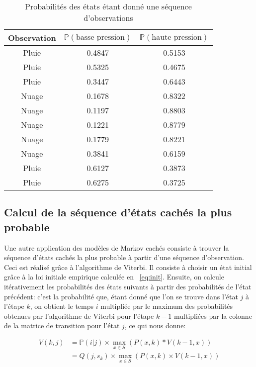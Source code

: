 \documentclass{article}
\begin{document}
\begin{multicols}{2}
\begin{table}[H]
    \begin{center}
        \centering
        \captionsetup{justification=centering}
        \caption{\label{tab:fwdbwd}Probabilités des états étant donné une séquence d'observations}
        \begin{tabular}{|c|c|c|}
            \hline
            Observation & $\mathbb{P}(\text{basse pression})$ & $\mathbb{P}(\text{haute pression})$ \\
            \hline
            Pluie & 0.4847 & 0.5153 \\
            Pluie & 0.5325 & 0.4675 \\
            Pluie & 0.3447 & 0.6443 \\
            Nuage & 0.1678 & 0.8322 \\
            Nuage & 0.1197 & 0.8803 \\
            Nuage & 0.1221 & 0.8779 \\
            Nuage & 0.1779 & 0.8221 \\
            Nuage & 0.3841 & 0.6159 \\
            Pluie & 0.6127 & 0.3873 \\
            Pluie & 0.6275 & 0.3725 \\
            \hline
        \end{tabular}
    \end{center}
\end{table}

\subsection{Calcul de la séquence d'états cachés la plus probable}

Une autre application des modèles de Markov cachés consiste à trouver la
séquence d'états cachés la plus probable à partir d'une séquence d'observation.
Ceci est réalisé grâce à l'algorithme de Viterbi. Il consiste à choisir un état
initial grâce à la loi initiale empirique calculée en ~\ref{eq:init}. Ensuite,
on calcule itérativement les probabilités des états suivants à partir des
probabilités de l'état précédent: c'est la probabilité que, étant donné que l'on
se trouve dans l'état $j$ à l'étape $k$, on obtient le temps $i$ multipliée par
le maximum des probabilités obtenues par l'algorithme de Viterbi pour l'étape
$k - 1$ multipliées par la colonne de la matrice de transition pour l'état $j$,
ce qui nous donne:

\begin{equation}\label{eq:viterbi}
    \begin{split}
        V(k,j) &= \mathbb{P}(i | j) \times \operatorname*{max}_{x \in S}(P(x, k) * V(k - 1, x)) \\
               &= Q(j, s_k) \times \operatorname*{max}_{x \in S}(P(x, k) \times V(k - 1, x)) \\
    \end{split}
\end{equation}


\end{multicols}
\end{document}
